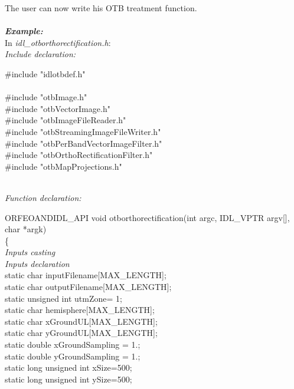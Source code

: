The user can now write his OTB treatment function.
\\
\\
\emph{\textbf{Example:}}\\
\indent In \emph{idl\_otborthorectification.h}:\\
\indent \emph{Include declaration:}\\
\begin{scriptsize}

\indent \#include "idlotbdef.h"\\
\\
\indent \#include "otbImage.h"\\
\indent \#include "otbVectorImage.h"\\
\indent \#include "otbImageFileReader.h"\\
\indent \#include "otbStreamingImageFileWriter.h"\\
\indent \#include "otbPerBandVectorImageFilter.h"\\
\indent \#include "otbOrthoRectificationFilter.h"\\
\indent \#include "otbMapProjections.h"\\
\end{scriptsize}
\\
\indent \emph{Function declaration:}\\
\begin{scriptsize}
\indent ORFEOANDIDL\_API void otborthorectification(int argc, IDL\_VPTR argv[], char *argk)\\
\indent \{\\
\indent \emph{Inputs casting}\\
\indent \emph{Inputs declaration}\\
\indent static char inputFilename[MAX\_LENGTH];\\
\indent static char outputFilename[MAX\_LENGTH];\\
\indent static unsigned int utmZone= 1;\\
\indent static char hemisphere[MAX\_LENGTH];\\
\indent static char xGroundUL[MAX\_LENGTH];\\
\indent static char yGroundUL[MAX\_LENGTH];\\
\indent static double xGroundSampling = 1.;\\
\indent static double yGroundSampling = 1.;\\
\indent static long unsigned int xSize=500;\\
\indent static long unsigned int ySize=500;\\
\end{scriptsize}
